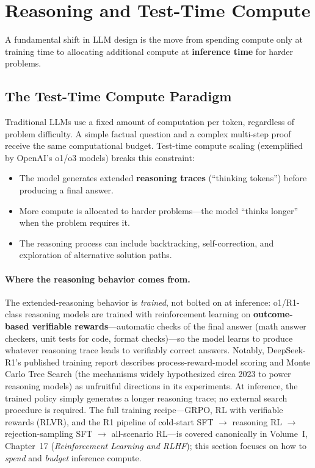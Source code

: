 \section{Reasoning and Test-Time Compute}
\label{sec:reasoning}

A fundamental shift in LLM design is the move from spending compute only at
training time to allocating additional compute at \textbf{inference time} for
harder problems.

\subsection{The Test-Time Compute Paradigm}

Traditional LLMs use a fixed amount of computation per token, regardless of
problem difficulty.  A simple factual question and a complex multi-step proof
receive the same computational budget.  Test-time compute scaling (exemplified
by OpenAI's o1/o3 models) breaks this constraint:

\begin{itemize}[leftmargin=*]
\item The model generates extended \textbf{reasoning traces} (``thinking
  tokens'') before producing a final answer.
\item More compute is allocated to harder problems---the model ``thinks
  longer'' when the problem requires it.
\item The reasoning process can include backtracking, self-correction, and
  exploration of alternative solution paths.
\end{itemize}

\paragraph{Where the reasoning behavior comes from.}
The extended-reasoning behavior is \emph{trained}, not bolted on at
inference: o1/R1-class reasoning models are trained with reinforcement
learning on \textbf{outcome-based verifiable rewards}---automatic checks of
the final answer (math answer checkers, unit tests for code, format
checks)---so the model learns to produce whatever reasoning trace leads to
verifiably correct answers.  Notably, DeepSeek-R1's published training
report describes process-reward-model scoring and Monte Carlo Tree Search
(the mechanisms widely hypothesized circa 2023 to power reasoning models)
as unfruitful directions in its experiments.  At inference, the trained
policy simply generates a longer reasoning trace; no external search
procedure is required.  The full training recipe---GRPO, RL with verifiable
rewards (RLVR), and the R1 pipeline of cold-start SFT $\to$ reasoning RL
$\to$ rejection-sampling SFT $\to$ all-scenario RL---is covered canonically
in Volume~I, Chapter~17 (\emph{Reinforcement Learning and RLHF}); this
section focuses on how to \emph{spend} and \emph{budget} inference compute.

